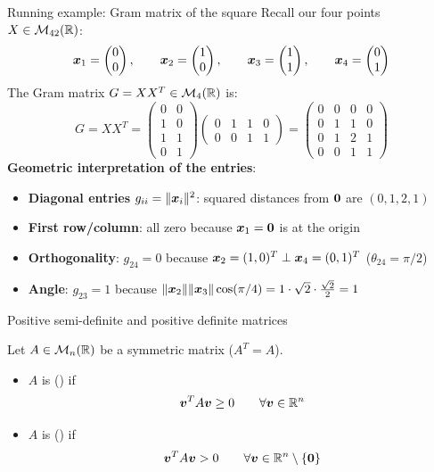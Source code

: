 \documentclass[aspectratio=169]{beamer}\usepackage[]{graphicx}\usepackage[]{xcolor}
\begin{document}
\begin{frame}{Running example: Gram matrix of the square}
Recall our four points $X\in\mathcal{M}_{42}(\mathbb{R})$:
\[
\bm{x}_1 = \begin{pmatrix} 0 \\ 0 \end{pmatrix}, \qquad
\bm{x}_2 = \begin{pmatrix} 1 \\ 0 \end{pmatrix}, \qquad
\bm{x}_3 = \begin{pmatrix} 1 \\ 1 \end{pmatrix}, \qquad
\bm{x}_4 = \begin{pmatrix} 0 \\ 1 \end{pmatrix}
\]
\vfill
The Gram matrix $G = XX^T \in \mathcal{M}_4(\mathbb{R})$ is:
\[
G = XX^T = \begin{pmatrix}
0 & 0 \\
1 & 0 \\
1 & 1 \\
0 & 1
\end{pmatrix}
\begin{pmatrix}
0 & 1 & 1 & 0 \\
0 & 0 & 1 & 1
\end{pmatrix}
= \begin{pmatrix}
0 & 0 & 0 & 0 \\
0 & 1 & 1 & 0 \\
0 & 1 & 2 & 1 \\
0 & 0 & 1 & 1
\end{pmatrix}
\]
\vfill
\textbf{Geometric interpretation of the entries}:
\begin{itemize}
\item \textbf{Diagonal entries} $g_{ii} = \|\bm{x}_i\|^2$: squared distances from $\b0$ are $(0, 1, 2, 1)$
\item \textbf{First row/column}: all zero because $\bx_1 = \b0$ is at the origin
\item \textbf{Orthogonality}: $g_{24} = 0$ because $\bm{x}_2 = (1,0)^T \perp \bm{x}_4 = (0,1)^T$ ($\theta_{24} = \pi/2$)
\item \textbf{Angle}: $g_{23} = 1$ because $\|\bm{x}_2\|\|\bm{x}_3\|\cos(\pi/4) = 1 \cdot \sqrt{2} \cdot \frac{\sqrt{2}}{2} = 1$
\end{itemize}
\end{frame}

\begin{frame}{Positive semi-definite and positive definite matrices}
\begin{importantdefinition}
\label{def:psd_pd}
Let $A\in\mathcal{M}_n(\mathbb{R})$ be a symmetric matrix ($A^T = A$).
\begin{itemize}
\item $A$ is  () if
\[
\bm{v}^T A\bm{v} \ge 0 \qquad \forall \bm{v}\in\mathbb{R}^n
\]
\item $A$ is  () if
\[
\bv^T A\bv > 0 \qquad \forall \bv\in\IR^n\setminus\{\b0\}
\]
\end{itemize}
\end{importantdefinition}
\end{frame}
\end{document}
